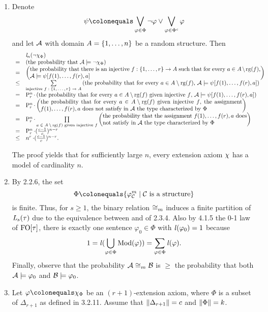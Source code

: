 \begin{enumerate}[1.]
%
\item {} Denote
\[
\psi \defas \blor_{\varphi \in \Phi} \neg\varphi \lor \blor_{\varphi \in \cmpl{\Phi}} \varphi
\]
and let $\mathcal{A}$ with domain $A = {\{1, \ldots, n\}}$ be a random structure. Then
\[
\begin{array}{ll}
\    & \lprob[n](\neg\extaxm[\Phi]) \cr
=    & \paren{\mbox{the probability that \mathmode{\strct{A} \satis \neg\extaxm[\Phi]}}} \cr
=    & \paren{\parbox{40em}{the probability that there is an injective \mathmode{f : \sete{1, \etc, r} \to A} such that for every \mathmode{a \in A \setminus \rg(f)}, \mathmode{\strct{A} \satis \psi[f(1), \etc, f(r), a]}}} \cr
\leq & \sum\limits_{\text{injective \mathmode{f : \sete{1, \etc, r} \to A}}} \paren{\mbox{the probability that for every \mathmode{a \in A \setminus \rg(f)}, \mathmode{\strct{A} \satis \psi[f(1), \etc, f(r), a]}}} \cr
=    & \prmt{n}{r} \mul \paren{\mbox{the probability that for every \mathmode{a \in A \setminus \rg(f)} given injective \mathmode{f}, \mathmode{\strct{A} \satis \psi[f(1), \etc, f(r), a]}}} \cr
=    & \prmt{n}{r} \mul \paren{\parbox{35em}{the probability that for every \mathmode{a \in A \setminus \rg(f)} given injective \mathmode{f}, the assignment \mathmode{f(1), \etc, f(r), a} does not satisfy in \mathmode{\strct{A}} the type characterized by \mathmode{\Phi}}} \cr
=    & \prmt{n}{r} \mul \prod\limits_{\text{\mathmode{a \in A \setminus \rg(f)} given injective \mathmode{f}}} \paren{\parbox{25em}{the probability that the assignment \mathmode{f(1), \etc, f(r), a} does not satisfy in \mathmode{\strct{A}} the type characterized by \mathmode{\Phi}}} \cr
=    & \prmt{n}{r} \mul (\frac{c - 1}{c})^{n - r} \cr
\leq & n^r \mul (\frac{c - 1}{c})^{n - r}. \cr
\end{array}
\]

\begin{note}
The proof yields that for sufficiently large $n$, every extension axiom $\extaxm$ has a model of cardinality $n$.
\end{note}
%
\item {} By 2.2.6, the set
\[
\Phi \defas \sett{\hint{m}{\strct{C}}}{\mathmode{\strct{C}} is a structure}
\]
is finite. Thus, for $s \geq 1$, the binary relation $\isom_m$ induces a finite partition of $\mathit{L}_{s}(\tau)$ due to the equivalence between  and  of 2.3.4. Also by 4.1.5 the 0-1 law of $\folog\of{\tau}$, there is exactly one sentence $\varphi_0 \in \Phi$ with $\lprob(\varphi_0) = 1$ because
\[
1 = \lprob(\bunion_{\varphi \in \Phi} \modclass(\varphi)) = \sum_{\varphi \in \Phi} \lprob(\varphi).
\]
Finally, observe that the probability $\strct{A} \isom_m \strct{B}$ is $\geq$ the probability that both $\mathcal{A} \models \varphi_0$ and $\mathcal{B} \models \varphi_0$.
%
\item {} Let $\varphi \defas \extaxm[\Phi]$ be an $(r + 1)$-extension axiom, where $\Phi$ is a subset of $\Delta_{r + 1}$ as defined in 3.2.11. Assume that $\|\Delta_{r + 1}\| = c$ and $\|\Phi\| = k$.


\end{enumerate}
